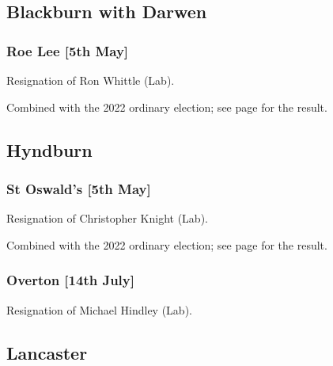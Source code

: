 \documentclass[a4paper,openany]{book}
\begin{document}
\begin{resultsiii}
\subsection*{Blackburn with Darwen}

\subsubsection*{Roe Lee \hspace*{\fill}\nolinebreak[1]%
	\enspace\hspace*{\fill}
	[5th May]}


Resignation of Ron Whittle (Lab).

Combined with the 2022 ordinary election; see page \pageref{BlackburnDarwenRoeLee} for the result.

\subsection*{Hyndburn}

\subsubsection*{St Oswald's \hspace*{\fill}\nolinebreak[1]%
	\enspace\hspace*{\fill}
	[5th May]}


Resignation of Christopher Knight (Lab).

Combined with the 2022 ordinary election; see page \pageref{HyndburnStOswalds} for the result.

\subsubsection*{Overton \hspace*{\fill}\nolinebreak[1]%
	\enspace\hspace*{\fill}
	[14th July]}


Resignation of Michael Hindley (Lab).

\subsection*{Lancaster}


\end{resultsiii}
\end{document}
